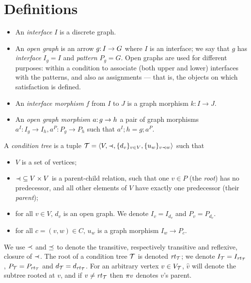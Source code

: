 \section{Definitions}
\label{sec:definitions}

\begin{itemize}
\item An \emph{interface} $I$ is a discrete graph.

\item An \emph{open graph} is an arrow $g{:}\, I\rightarrow G$ where $I$ is an interface; we say that $g$ has \emph{interface} $I_g=I$ and \emph{pattern} $P_g=G$. Open graphs are used for different purposes: within a condition to associate (both upper and lower) interfaces with the patterns, and also as assignments --- that is, the objects on which satisfaction is defined.

\item An \emph{interface morphism} $f$ from $I$ to $J$ is a graph morphism $k:I\to J$.

\item An \emph{open graph morphism} $a{:}\, g\rightarrow h$ a pair of graph morphisms $a^I:I_g\to I_h, a^P:P_g\to P_h$ such that $a^I;h=g;a^P$.
\end{itemize}
%
\begin{definition}\label{def:condition tree}
A \emph{condition tree} is a tuple $\cT=\tupof{V, {\parentof}, \setof{d_v}_{v\in V}, \setof{u_w}_{v\parentof w}}$ such that

\begin{itemize}[topsep=\smallskipamount]
\item $V$ is a set of vertices;

\item ${\parentof}\subseteq V\times V$ is a parent-child relation, such that one $v\in P$ (the \emph{root}) has no predecessor, and all other elements of $V$ have exactly one predecessor (their \emph{parent});

\item for all $v\in V$, $d_v$ is an open graph. We denote $I_v=I_{d_v}$ and $P_v=P_{d_v}$.

\item for all $c=(v,w)\in C$, $u_w$ is a graph morphism $I_w\to P_c$.
\end{itemize}
\end{definition}
%
We use $\prec$ and $\preceq$ to denote the transitive, respectively transitive and reflexive, closure of $\parentof$. The root of a condition tree ${\mathcal{T}}$ is denoted $\mathit{rt}_{{\mathcal{T}}}$; we denote $I_{\mathcal{T}}=I_{\mathit{rt}_{{\mathcal{T}}}}$, $P_{\mathcal{T}}=P_{\mathit{rt}_{{\mathcal{T}}}}$ and $d_{\mathcal{T}}=d_{\mathit{rt}_{{\mathcal{T}}}}$. For an arbitrary vertex $v\in V_{\mathcal{T}}$, $\hat v$ will denote the subtree rooted at $v$, and if $v\neq\mathit{rt}_{{\mathcal{T}}}$ then $\pi{v}$ denotes $v$'s parent.

